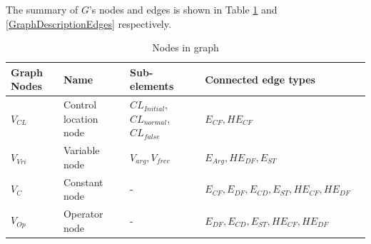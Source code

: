 \documentclass{article}
\begin{document}
The summary of $G$'s nodes and edges is shown in Table \ref{GraphDescriptionNodes} and \ref{GraphDescriptionEdges} respectively.
\begin{table}[h]\caption{Nodes in graph} \label{GraphDescriptionNodes}
\begin{center}
\begin{tabular}{lp{3cm}p{3cm}p{6cm}p{8cm}}
\hline
Graph Nodes & Name & Sub-elements & Connected edge types \\
\hline
$V_{CL}$  & Control location node            & $CL_{Initial}$, $CL_{normal}$, $CL_{false}$       & $E_{CF},HE_{CF}$\\
$V_{Vri}$ & Variable node                    & $V_{arg}, V_{free}$    & $E_{Arg},HE_{DF},E_{ST}$  \\
$V_{C}$   & Constant node                    & -                       & $E_{CF},E_{DF},E_{CD},E_{ST},HE_{CF},HE_{DF}$\\
$V_{Op}$  & Operator node                    & -                       & $E_{DF},E_{CD},E_{ST},HE_{CF},HE_{DF}$\\
\hline
\end{tabular}
\end{center}
\end{table}
\end{document}
